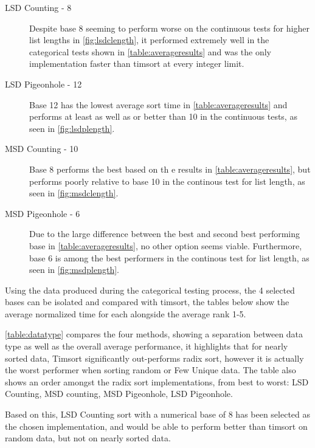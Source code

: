 \documentclass[12pt]{article}
\begin{document}
	\begin{description}
		\item[LSD Counting - 8] Despite base 8 seeming to perform worse on the continuous tests for higher list lengths in \autoref{fig:lsdclength}, it performed extremely well in the categorical tests shown in \autoref{table:averageresults} and was the only implementation faster than timsort at every integer limit.
		\item[LSD Pigeonhole - 12] Base 12 has the lowest average sort time in \autoref{table:averageresults} and performs at least as well as or better than 10 in the continuous tests, as seen in \autoref{fig:lsdplength}.
		\item[MSD Counting - 10] Base 8 performs the best based on th e results in \autoref{table:averageresults}, but performs poorly relative to base 10 in the continous test for list length, as seen in \autoref{fig:msdclength}.
		\item[MSD Pigeonhole - 6] Due to the large difference between the best and second best performing base in \autoref{table:averageresults}, no other option seems viable. Furthermore, base 6 is among the best performers in the continous test for list length, as seen in \autoref{fig:msdplength}.
	\end{description}
	\pagebreak
	Using the data produced during the categorical testing process, the 4 selected bases can be isolated and compared with timsort, the tables below show the average normalized time for each alongside the average rank 1-5.
	\par
	\autoref{table:datatype} compares the four methods, showing a separation between data type as well as the overall average performance, it highlights that for nearly sorted data, Timsort significantly out-performs radix sort, however it is actually the worst performer when sorting random or Few Unique data. The table also shows an order amongst the radix sort implementations, from best to worst: LSD Counting, MSD counting, MSD Pigeonhole, LSD Pigeonhole.
	\par
	Based on this, LSD Counting sort with a numerical base of 8 has been selected as the chosen implementation, and would be able to perform better than timsort on random data, but not on nearly sorted data.
\end{document}
